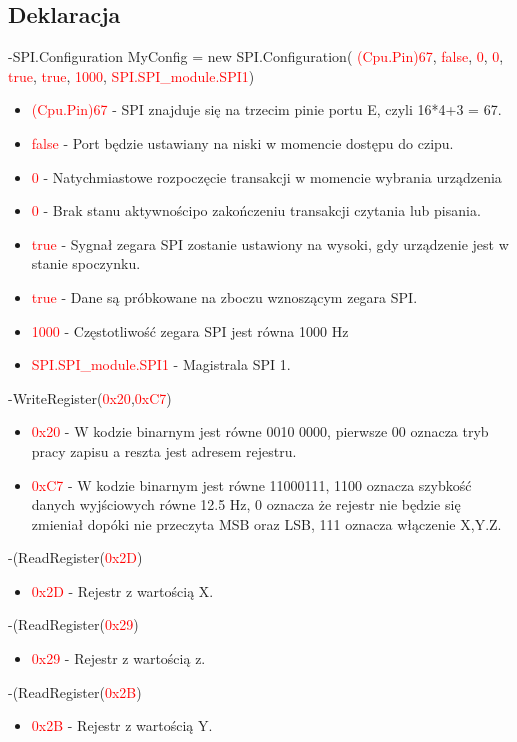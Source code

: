 \documentclass{article}
\begin{document}
\subsection{Deklaracja}
-SPI.Configuration MyConfig =
new SPI.Configuration(\space \textcolor{red}{ (Cpu.Pin)67},\space \textcolor{red}{ false},\space \textcolor{red}{ 0}, \space \textcolor{red}{ 0},\space \textcolor{red}{ true},\space \textcolor{red}{ true},\space \textcolor{red}{ 1000},\space \textcolor{red}{ SPI.SPI\_module.SPI1})
\begin{itemize}
\item \textcolor{red}{(Cpu.Pin)67} - SPI znajduje się na trzecim pinie portu E, czyli 16*4+3 = 67.
\item \textcolor{red}{false} - Port będzie ustawiany na niski w momencie dostępu do czipu.
\item \textcolor{red}{0} - Natychmiastowe rozpoczęcie transakcji w momencie wybrania urządzenia
\item \textcolor{red}{0} - Brak stanu aktywnościpo zakończeniu transakcji czytania lub pisania.
\item \textcolor{red}{true} - Sygnał zegara SPI zostanie ustawiony na wysoki, gdy urządzenie jest w stanie spoczynku.
\item \textcolor{red}{true} -  Dane są próbkowane na zboczu wznoszącym zegara SPI.
\item \textcolor{red}{1000} -  Częstotliwość zegara SPI jest równa 1000 Hz
\item \textcolor{red}{SPI.SPI\_module.SPI1} - Magistrala SPI 1. 
\end{itemize}
-WriteRegister(\space \textcolor{red}{0x20},\space \textcolor{red}{0xC7})
\begin{itemize}
\item \textcolor{red}{0x20} -  W kodzie binarnym jest równe 0010 0000, pierwsze 00 oznacza tryb pracy zapisu  a reszta jest adresem rejestru.
\item \textcolor{red}{0xC7} -  W kodzie binarnym jest równe 11000111, 1100 oznacza szybkość danych wyjściowych równe 12.5 Hz, 0 oznacza że rejestr nie będzie się zmieniał dopóki nie przeczyta MSB oraz LSB, 111 oznacza włączenie X,Y.Z.
\end{itemize}
-(ReadRegister(\textcolor{red}{0x2D})
\begin{itemize}
\item \textcolor{red}{0x2D } - Rejestr z wartością X.
\end{itemize}
-(ReadRegister(\textcolor{red}{0x29})
\begin{itemize}
\item \textcolor{red}{ 0x29 } - Rejestr z wartością z.
\end{itemize}
-(ReadRegister(\textcolor{red}{0x2B})
\begin{itemize}
\item \textcolor{red}{ 0x2B } - Rejestr z wartością Y.
\end{itemize}
\end{document}
